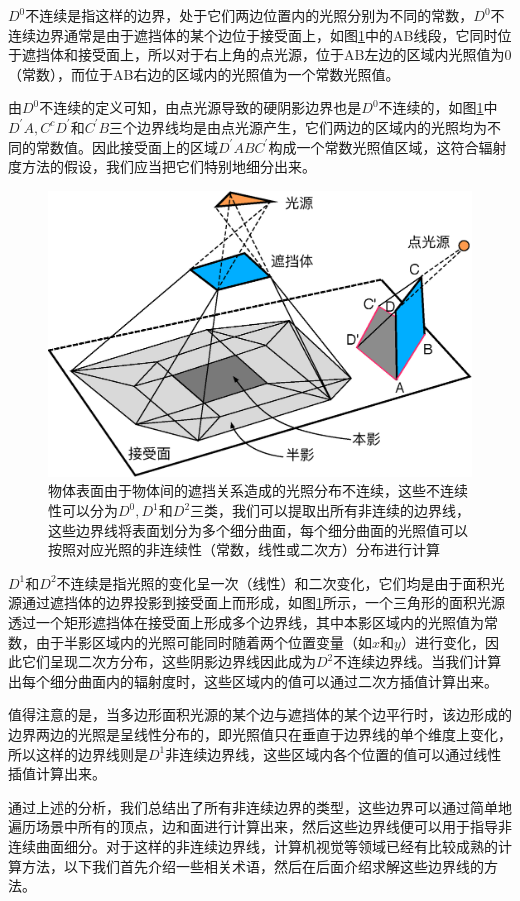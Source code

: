 $D^{0}$不连续是指这样的边界，处于它们两边位置内的光照分别为不同的常数，$D^{0}$不连续边界通常是由于遮挡体的某个边位于接受面上，如图\ref{f:r-boundaries}中的AB线段，它同时位于遮挡体和接受面上，所以对于右上角的点光源，位于AB左边的区域内光照值为0（常数），而位于AB右边的区域内的光照值为一个常数光照值。

由$D^{0}$不连续的定义可知，由点光源导致的硬阴影边界也是$D^{0}$不连续的，如图\ref{f:r-boundaries}中$D^{'}A,C^{c}D^{'}$和$C^{'}B$三个边界线均是由点光源产生，它们两边的区域内的光照均为不同的常数值。因此接受面上的区域$D^{'}ABC^{'}$构成一个常数光照值区域，这符合辐射度方法的假设，我们应当把它们特别地细分出来。

\begin{figure}
\sidecaption
	\includegraphics[width=.65\textwidth]{figures/r/boundaries}
	\caption{物体表面由于物体间的遮挡关系造成的光照分布不连续，这些不连续性可以分为$D^{0},D^{1}$和$D^{2}$三类，我们可以提取出所有非连续的边界线，这些边界线将表面划分为多个细分曲面，每个细分曲面的光照值可以按照对应光照的非连续性（常数，线性或二次方）分布进行计算}
	\label{f:r-boundaries}
\end{figure}

$D^{1}$和$D^{2}$不连续是指光照的变化呈一次（线性）和二次变化，它们均是由于面积光源通过遮挡体的边界投影到接受面上而形成，如图\ref{f:r-boundaries}所示，一个三角形的面积光源透过一个矩形遮挡体在接受面上形成多个边界线，其中本影区域内的光照值为常数，由于半影区域内的光照可能同时随着两个位置变量（如$x$和$y$）进行变化，因此它们呈现二次方分布，这些阴影边界线因此成为$D^{2}$不连续边界线。当我们计算出每个细分曲面内的辐射度时，这些区域内的值可以通过二次方插值计算出来。

值得注意的是，当多边形面积光源的某个边与遮挡体的某个边平行时，该边形成的边界两边的光照是呈线性分布的，即光照值只在垂直于边界线的单个维度上变化，所以这样的边界线则是$D^{1}$非连续边界线，这些区域内各个位置的值可以通过线性插值计算出来。

通过上述的分析，我们总结出了所有非连续边界的类型，这些边界可以通过简单地遍历场景中所有的顶点，边和面进行计算出来，然后这些边界线便可以用于指导非连续曲面细分。对于这样的非连续边界线，计算机视觉等领域已经有比较成熟的计算方法，以下我们首先介绍一些相关术语，然后在后面介绍求解这些边界线的方法。



